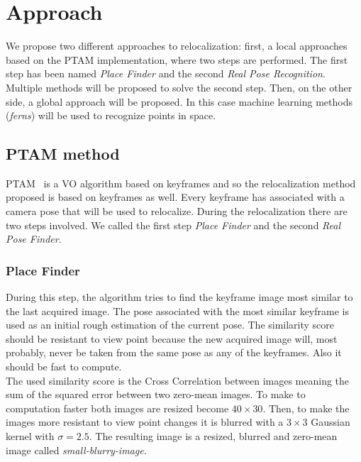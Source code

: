 \chapter{Approach}\label{sec:approach}

We propose two different approaches to relocalization: first, a local approaches based on the PTAM implementation, where two steps are performed. The first step has been named \textit{Place Finder} and the second \textit{Real Pose Recognition}. Multiple methods will be proposed to solve the second step. Then, on the other side, a global approach will be proposed. In this case machine learning methods (\textit{ferns}) will be used to recognize points in space.

\section{PTAM method}
\label{sec:ptam_method}

PTAM~\cite{KleinMurray2007} is a VO algorithm based on keyframes and so the relocalization method proposed is based on keyframes as well. Every keyframe has associated with a camera pose that will be used to relocalize. During the relocalization there are two steps involved. We called the first step \textit{Place Finder} and the second \textit{Real Pose Finder}.

\subsection{Place Finder}
\label{ssub:place_recognition}

During this step, the algorithm tries to find the keyframe image most similar to the last acquired image. The pose associated with the most similar keyframe is used as an initial rough estimation of the current pose. The similarity score should be resistant to view point because the new acquired image will, most probably, never be taken from the same pose as any of the keyframes. Also it should be fast to compute.\\

The used similarity score is the Cross Correlation between images meaning the sum of the squared error between two zero-mean images. To make to computation faster both images are resized become $40\times30$. Then, to make the images more resistant to view point changes it is blurred with a $3\times3$ Gaussian kernel with $\sigma=2.5$. The resulting image is a resized, blurred and zero-mean image called \textit{small-blurry-image}.\\

